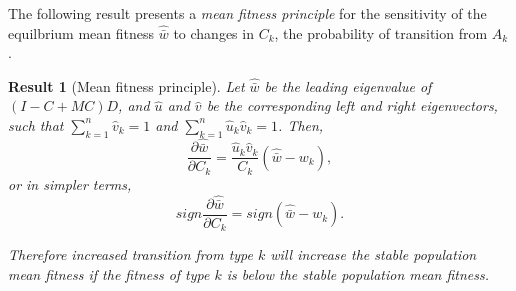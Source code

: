 \documentclass[9pt, a4paper, twocolumn]{extarticle}
\newtheorem{result}{Result}
\begin{document}
The following result presents a \emph{mean fitness principle} for the
sensitivity of the equilbrium mean fitness $\hat{\bar w}$ to changes
in $C_k$, the probability of transition from $A_k$.
\medskip

\begin{result}[Mean fitness principle]\label{result:mfp}
Let $\hat{\bar w}$ be the leading eigenvalue of $(I-C+MC)D$,
and $\hat u$ and $\hat v$ be the corresponding left and right eigenvectors, such that $\sum_{k=1}^{n}\hat v_k=1$ and $\sum_{k=1}^{n}\hat u_k\hat v_k=1$.
Then,
\begin{equation}\label{eq:mfp}
\frac{\partial \hat{\bar w}}{\partial C_k} = 
\frac{\hat u_k \hat v_k}{C_k} (\hat{\bar w} - w_k),
\end{equation}
or in simpler terms,
\begin{equation}\label{eq:mfp_sign}
sign\frac{\partial \hat{\bar w}}{\partial C_k} = 
sign(\hat{\bar w} - w_k).
\end{equation}

Therefore increased transition from type $k$ will increase the stable population mean fitness if the fitness of type $k$ is below the stable population mean fitness.
\end{result}
\end{document}
